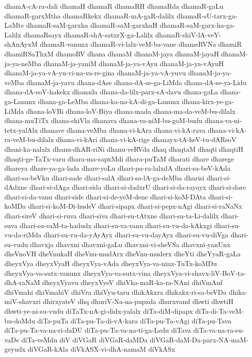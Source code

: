 {dhamA-cA-ra-dali
dhamaH
dhamaR
dhamaRH
dhamaRda
dhamaR-gaLu
dhamaR-garxMtha
dhamaRkekx
dhamaR-mA-gaR-dalilx
dhamaR-sU-tarx-ga-LaMte
dhamaR-saM-garxha
dhamaR-saM-garxhaH
dhamaR-saM-garx-ha-ga-Lalilx
dhamaRsayx
dhamaR-shA-satxrX-ga-Lalilx
dhamaR-shiV-lA-veY-shAnAyxM
dhamaR-vanunx
dhamaR-vi-lalx-veM-ba-vane
dhameRVNa
dhamiR
dhamiRSaThxM
dhamoRV
dhana
dhanaM
dhanaM-jaya
dhanaM-jayaH
dhanaM-ja-ya-neMba
dhanaM-ja-yaniM
dhanaM-ja-ya-vAyu
dhanaM-ja-ya-vAyuH
dhanaM-ja-ya-vA-yu-vi-na-va-re-gina
dhanaM-ja-ya-vA-yuvu
dhanaM-ja-ya-veMba
dhanaM-ja-yavu
dhana-dAse
dhana-dA-se-ga-LiMda
dhana-dA-se-ya-Lidu
dhana-dA-soV-hakekx
dhanada
dhana-da-lilx-parx-sA-davu
dhana-gaLa
dhana-ga-Lanunx
dhana-ga-LeMba
dhana-ka-na-kA-di-ga-Lanunx
dhana-kirx-ye-ga-LiMda
dhana-loVBi
dhana-loV-Biya
dhana-mada
dhana-ma-da-veM-bu-dilalx
dhana-muTiTx
dhana-shiVla
dhanava
dhana-va-niM-bu-goM-budu
dhana-va-ni-tetx-yalAlx
dhanave
dhana-veMba
dhana-vi-kAra
dhana-vi-kA-rava
dhana-vi-kA-ra-veM-bu-dilalx
dhana-vi-kAri
dhana-vi-kA-rige
dhanayx-tA-heV-tu-dARsoV
dhani-ka-nalalx
dhanu-dhAR-riNi
dhanu-veRVda
dhaq
dhaqtaM
dhaqti
dhaqtiH
dhaqti-ge-TaTx-varu
dhara-ma-sapxMdi
dhara-puTaM
dharati
dhare
dharege
dhareya
dhare-ya-ga-lada
dhare-yoLu
dhari-pa-ra-lalxdA
dhari-sa-beV-kAda
dhari-sa-beVku
dhari-sade
dhari-salA
dhari-sa-lA-ga-deMba
dharisi
dhari-si-dAdxne
dhari-si-dAga
dhari-sida
dhari-si-dadxrU
dhari-si-da-rayayx
dhari-si-dare
dhari-si-da-vanu
dhari-side
dhari-si-de-yeM-dene
dhari-si-koM-DAta
dhari-si-koMDa
dhari-si-koM-Di-hudeV
dhari-sipapx
dhari-si-pepx-nAgi
dhari-si-raNaNx
dhari-sireV
dhari-si-ruva
dhari-siva
dhari-su-tAtxne
dhari-su-ta-Li-dalilx
dhari-suva
dhari-su-vaM-ta-hadudx
dhari-su-va-vanu
dhari-su-vu-da-kAkxgi
dhari-su-vu-da-riMda
dhari-su-vu-da-yAyAyx
dhari-su-vu-dayAyx
dhari-su-vu-diVga
dhari-su-vudu
dhavxja
dhavxni
dhavxni-gaLu
dhavxni-vi-sheVSa
dhavxni-yanUnx
dheVnoVH
dheVnukaH
dheVnu-mudArx
dheVnu-muderx
dheYti
dheYyaR-gaLa
dheyxVya
dheyxVyaH
dheyxVya-vAda
dheyxVya-va-ninx-TuTx-koMDu
dheyxVya-va-sutx-vanunx
dheyxVya-va-sutx-vina
dheyxVya-vi-shavx-liV-BoV-ta-dhA-raNaM
dheyxVyavu
dheyxVyeV
dhiVka-maR-ka-ra-NAni
dhiVmAnf
dhiVmahi
dhiVmahiV
dhiVra
dhiVyu-taru
dhikAkxra
dhikakx-ri-sa-beVDa
dhika-miV-shavxri
dhirxyateV
dhq
dhuriV-Na-na-pupxda
dhurxvamf
dhwti
dhwtiH
dhwti-ye-ni-su-vudu
diTaTx-nA-gi-didx-yalalx
diTa-diM-dipapx
diTa-di-Ta-veM-bu-doMdu
diTa-puTa
diTa-pu-Ta-di-vA-kara
diTa-pu-Ta-vAgi
diTa-pu-Tava
diTa-pu-Ta-va-na-ri-daDU
diTa-pu-Ta-va-na-ti-ga-Ledu
diTava
diTa-va-na-ra-su-vaDe
diTa-veMdu
diV
diVGaR
diVGaR-daMDa
diVGaR-daM-Da-parx-NA-maM-geyudx
diVGaR-kAla
diVkASX-vi-dhA-namaM
diVkASx
}
